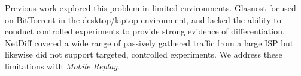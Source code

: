 \documentclass[letterpaper]{sig-alternate-2013}
\begin{document}
Previous work \cite{glasnost, zhang:netdiff, tariq:nano} explored this problem in limited environments. Glasnost focused on BitTorrent in the desktop/laptop environment, and lacked the ability to conduct controlled experiments to provide strong evidence of differentiation. NetDiff covered a wide range of passively gathered traffic from a large ISP but likewise did not support targeted, controlled experiments. We address these limitations with \textit{Mobile Replay}.



\end{document}
